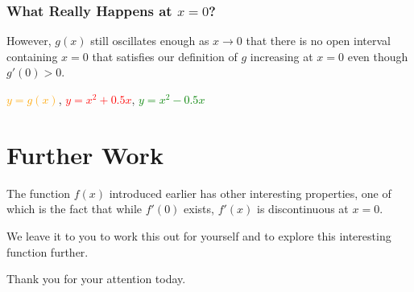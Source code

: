 \documentclass{beamer} %
\theoremstyle{definition} %
\begin{document}
\begin{frame}
\frametitle{What Really Happens at $x=0$?}
However, $g(x)$ still oscillates enough as $x\to 0$ that there is no open interval containing $x=0$ that satisfies our definition of $g$ increasing at $x=0$ even though $g'(0)>0$.\pause

\begin{center}

\textcolor{orange}{$y=g(x)$}, \textcolor{red}{$y=x^2+0.5x$}, \textcolor{green}{$y=x^2-0.5x$} 
\end{center}

\end{frame}

\section{Further Work} %

\begin{frame}
The function $f(x)$ introduced earlier has other interesting properties, one of which is the fact that while $f'(0)$ exists, $f'(x)$ is discontinuous at $x=0$.\vspace{.5cm}

We leave it to you to work this out for yourself and to explore this interesting function further.\vspace{.5cm}

Thank you for your attention today.
\end{frame}

\end{document}
